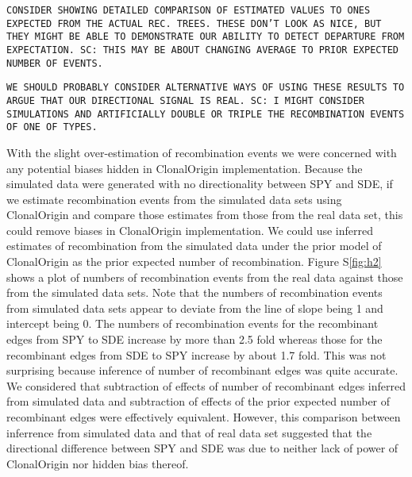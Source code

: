 \documentclass[english]{article}
\begin{document}
\texttt{CONSIDER SHOWING DETAILED COMPARISON OF ESTIMATED VALUES TO ONES 
EXPECTED FROM THE ACTUAL REC. TREES. THESE DON'T LOOK AS NICE, BUT THEY MIGHT 
BE ABLE TO DEMONSTRATE OUR ABILITY TO DETECT DEPARTURE FROM EXPECTATION. SC:
THIS MAY BE ABOUT CHANGING AVERAGE TO PRIOR EXPECTED NUMBER OF EVENTS.}

\texttt{WE SHOULD PROBABLY CONSIDER ALTERNATIVE WAYS OF USING THESE RESULTS TO 
ARGUE THAT OUR DIRECTIONAL SIGNAL IS REAL. SC: I MIGHT CONSIDER SIMULATIONS AND
ARTIFICIALLY DOUBLE OR TRIPLE THE RECOMBINATION EVENTS OF ONE OF TYPES.}

With the slight over-estimation of recombination events we were concerned with 
any potential biases hidden in ClonalOrigin implementation. Because the 
simulated data were generated with no directionality between SPY and SDE,  if 
we estimate recombination events from the simulated data sets using 
ClonalOrigin and compare those estimates from those from the real data set, 
this could remove biases in ClonalOrigin implementation. We could use inferred 
estimates of recombination from the simulated data under the prior model of 
ClonalOrigin as the prior expected number of recombination. Figure 
S\ref{fig:h2} shows a plot of numbers of recombination events from the real 
data against those from the simulated data sets. Note that the numbers of 
recombination events from simulated data sets appear to deviate from the line 
of slope being 1 and intercept being 0. The numbers of recombination events for 
the recombinant edges from SPY to SDE increase by more than 2.5 fold whereas 
those for the recombinant edges from SDE to SPY increase by about 1.7 fold.  
This was not surprising because inference of number of recombinant edges was 
quite accurate. We considered that subtraction of effects of number of 
recombinant edges inferred from simulated data and subtraction of effects of 
the prior expected number of recombinant edges were effectively equivalent. 
However, this comparison between inferrence from simulated data and that of 
real data set suggested that the directional difference between SPY and SDE was 
due to neither lack of power of ClonalOrigin nor hidden bias thereof.
\end{document}
